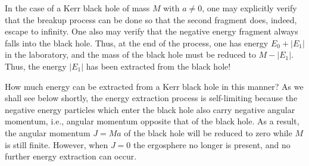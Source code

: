 In the case of a Kerr black hole of mass \(M\) with \(a\ne0\), one may explicitly
verify that the breakup process can be done so that the second fragment does,
indeed, escape to infinity. One also may verify that the negative energy fragment
always falls into the black hole. Thus, at the end of the process, one has energy
\(E_0+|E_1|\) in the laboratory, and the mass of the black hole must be reduced to
\(M-|E_1|\). Thus, the energy \(|E_1|\) has been extracted from the black hole!

How much energy can be extracted from a Kerr black hole in this manner? As we
shall see below shortly, the energy extraction process is self-limiting because the
negative energy particles which enter the black hole also carry negative angular
momentum, i.e., angular momentum opposite that of the black hole. As a result, the
angular momentum \(J=Ma\) of the black hole will be reduced to zero while \(M\) is
still finite. However, when \(J=0\) the ergosphere no longer is present, and no
further energy extraction can occur.



